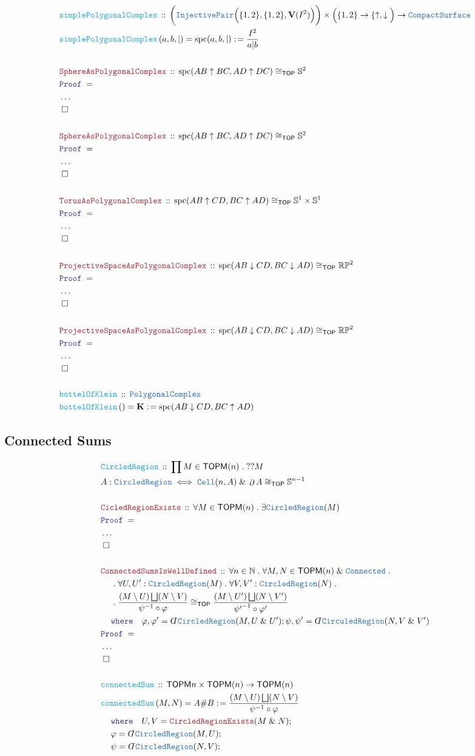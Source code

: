 \documentclass[12pt]{scrartcl}
\newcommand{\TYPE}[1]{\textcolor{NavyBlue}{\mathtt{#1}}}
\newcommand{\FUNC}[1]{\textcolor{Cerulean}{\mathtt{#1}}}
\newcommand{\LOGIC}[1]{\textcolor{Blue}{\mathtt{#1}}}
\newcommand{\THM}[1]{\textcolor{Maroon}{\mathtt{#1}}}
\renewcommand{\.}{\; . \;}
\newcommand{\de}{: \kern 0.1pc =}
\newcommand{\where}{\LOGIC{where}}
\newcommand{\Act}[1]{\left( #1 \right)}
\newcommand{\Theorem}[2]{& \THM{#1} \, :: \, #2 \\ & \Proof = \\ }
\newcommand{\DefineType}[3]{& #1 : \TYPE{#2} \iff #3 \\}
\newcommand{\DeclareFunc}[2]{& \FUNC{#1} \, :: \, #2 \\}
\newcommand{\DefineNamedFunc}[4]{&  \FUNC{#1}\Act{#2} = #3 \de #4 \\}
\newcommand{\NewLine}{\\ & \kern 1pc}
\newcommand{\Page}[1]{ \begin{align*} #1 \end{align*}   }
\newcommand{ \bd }{ \ByDef }
\newcommand{\NoProof}{ & \ldots \\ \EndProof}
\renewcommand{\And}{\; \& \;}
\newcommand{\Sphere}{\mathbb{S}}
\newcommand{\Nat}{\mathbb{N} }
\newcommand{\QED}{\; \square}
\newcommand{\EndProof}{& \QED \\}
\newcommand{\ByDef}{\rotatebox[origin=c]{-180}{$D$}}%
\newcommand{\Proof}{\LOGIC{Proof} \; }
\DeclareMathOperator*{\boundary}{\partial}
\newcommand{\TOP}{\mathsf{TOP}}
\newcommand{\CS}{\TYPE{CompactSurface}}
\newcommand{\TOPM}{\mathsf{TOPM}}
\begin{document}
\Page{
	\DeclareFunc{simplePolygonalComplex}{
		\bigg(\TYPE{InjectivePair}\Big(\{1,2\},\{1,2\},\mathbf{V}(I^2)\Big) \bigg)
		\times
		\Big(\{1,2\} \to \{\uparrow,\downarrow \Big)
		\to \CS
	}
	\DefineNamedFunc{simplePolygonalComplex}{a,b,|}{\mathrm{spc}(a,b,|)}
	{
		\frac{I^2}{a|b}
	}
	\\
	\Theorem{SphereAsPolygonalComplex}
	{
		\mathrm{spc}( AB \uparrow BC, AD \uparrow DC  ) \cong_{\TOP} \Sphere^2
	}
	\NoProof
	\\
	\Theorem{SphereAsPolygonalComplex}
	{
		\mathrm{spc}( AB \uparrow BC, AD \uparrow DC  ) \cong_{\TOP} \Sphere^2
	}
	\NoProof
	\\
	\Theorem{TorusAsPolygonalComplex}
	{
		\mathrm{spc}( AB \uparrow CD, BC \uparrow AD  ) 
		\cong_{\TOP} 
		\Sphere^1 \times \Sphere^1 
	}
	\NoProof
	\\
	\Theorem{ProjectiveSpaceAsPolygonalComplex}
	{
		\mathrm{spc}( AB \downarrow CD, BC \downarrow AD  ) 
		\cong_{\TOP} 
		\mathbb{RP}^{2}  
	}
	\NoProof
	\\
	\Theorem{ProjectiveSpaceAsPolygonalComplex}
	{
		\mathrm{spc}( AB \downarrow CD, BC \downarrow AD  ) 
		\cong_{\TOP} 
		\mathbb{RP}^{2}  
	}
	\NoProof
	\\
	\DeclareFunc{bottelOfKlein}
	{
		\TYPE{PolygonalComplex}
	}
	\DefineNamedFunc{bottelOfKlein}{}{\mathbf{K}}
	{    
		\mathrm{spc}(AB \downarrow CD, BC \uparrow AD  )
	}
}
\newpage
\subsection{Connected Sums}
\Page{
	\DeclareFunc{CircledRegion}
	{
		\prod M \in \TOPM(n) \. ??M
	}
	\DefineType{A}{CircledRegion}{
		\TYPE{Cell}(n,A) 
		\And 
		\boundary A \cong_{\TOP} \Sphere^{n-1}
	}
	\\
	\Theorem{CicledRegionExists}
	{
		\forall M \in \TOPM(n) \. 
		\exists \TYPE{CircledRegion}(M)
	}
	\NoProof
	\\
	\Theorem{ConnectedSumsIsWellDefined}
	{
		\forall n \in \Nat \.
		\forall M,N \in \TOPM(n) \And \TYPE{Connected} \.
		\NewLine \. 
		\forall U,U' : \TYPE{CircledRegion}(M) \. 
		\forall V, V' : \TYPE{CircledRegion}(N) \. \NewLine \. 
		\frac{(M \setminus U) \bigsqcup (N \setminus V)}
		{
			\psi^{-1} \circ \varphi
		}
		\cong_{\TOP}
		\frac{(M \setminus U') \bigsqcup (N \setminus V')}
		{
			{\psi'}^{-1} \circ \varphi'
		}
		\NewLine
		\where \quad
		\varphi,\varphi' = \bd \TYPE{CircledRegion}(M,U \And U');
		\psi, \psi' = \bd \TYPE{CirculedRegion}(N,V \And V')
	}
	\NoProof
	\\
	\DeclareFunc{connectedSum}
	{
		\TOPM{n} \times \TOPM(n) \to \TOPM(n)
	}
	\DefineNamedFunc{connectedSum}{M,N}{A \# B}
	{   
		\frac{(M \setminus U) \bigsqcup (N \setminus V)}
		{
			\psi^{-1} \circ \varphi
		}
		\NewLine
		\where 
		\quad
		U,V = \THM{CircledRegionExists}(M \And N) ;
		\NewLine
		\varphi = \bd \TYPE{CircledRegion}(M,U) ;
		\NewLine
		\psi = \bd \TYPE{CircledRegion}(N,V) ;
	}
}
\newpage
\end{document}

